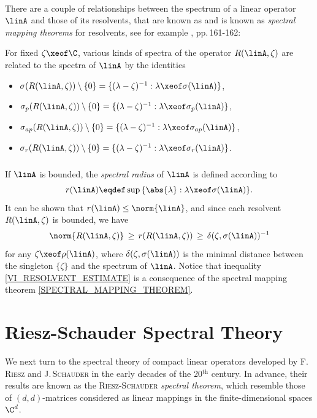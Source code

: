 \documentclass[11pt,twoside]{article}
\begin{document}
\paragraph{} %
There are a couple of relationships between the spectrum of a linear operator
$\linA$ and those of its resolvents,
that are known as
and is known as \textit{spectral mapping theorems} for resolvents,
see for example \cite{VI_EN}, pp.\,161-162:

\begin{theorem1}\label{SPECTRAL_MAPPING_THEOREM}
For fixed $\zeta \xeof \C$,
various kinds of spectra of the operator $R(\linA,\zeta)$ are related
to the spectra of $\linA$ by the identities

\begin{itemize}[leftmargin=12mm,itemsep=2pt]
\item[1.]
$\sigma(R(\linA,\zeta)) \setminus \{0\} =
\{(\lambda-\zeta)^{-1}: \lambda \xeof \sigma(\linA)\}$,
\item[2.]
$\sigma_p(R(\linA,\zeta)) \setminus \{0\} =
\{(\lambda-\zeta)^{-1}: \lambda \xeof \sigma_p(\linA)\}$,
\item[3.]
$\sigma_{ap}(R(\linA,\zeta)) \setminus \{0\} =
\{(\lambda-\zeta)^{-1}: \lambda \xeof \sigma_{ap}(\linA)\}$,
\item[4.]
$\sigma_r(R(\linA,\zeta)) \setminus \{0\} =
\{(\lambda-\zeta)^{-1}: \lambda \xeof \sigma_r(\linA)\}$.
\end{itemize}
\end{theorem1}

\subparagraph{} %
If $\linA$ is bounded,
the \textit{spectral radius} of $\linA$ is defined according to
\[
r(\linA) \eqdef \sup \, \{\abs{\lambda} : \lambda \xeof \sigma(\linA)\}.
\]
It can be shown that $r(\linA) \leq \norm{\linA}$,
and since each resolvent $R(\linA,\zeta)$ is bounded,
we have
\begin{equation}\label{VI_RESOLVENT_ESTIMATE}
\norm{R(\linA,\zeta)} \, \geq \,
r(R(\linA,\zeta))     \, \geq \,
\delta(\zeta,\sigma(\linA))^{-1}
\end{equation}
for any $\zeta \xeof \rho(\linA)$,
where $\delta(\zeta,\sigma(\linA))$ is the minimal distance between
the singleton $\{\zeta\}$ and the spectrum of $\linA$.
Notice that inequality \eqref{VI_RESOLVENT_ESTIMATE} is a consequence
of the spectral mapping theorem \ref{SPECTRAL_MAPPING_THEOREM}.

\section{Riesz-Schauder Spectral Theory}
We next turn to the spectral theory of compact linear operators
developed by \textsc{F.\,Riesz} and \textsc{J.\,Schauder} in the early
decades of the 20$^{\textrm{th}}$ century.
In advance,
their results are known
as the \textsc{Riesz-Schauder} \textit{spectral theorem},
which resemble those of $(d,d)$-matrices
considered as linear mappings in the finite-dimensional spaces $\C^d$.
\end{document}
